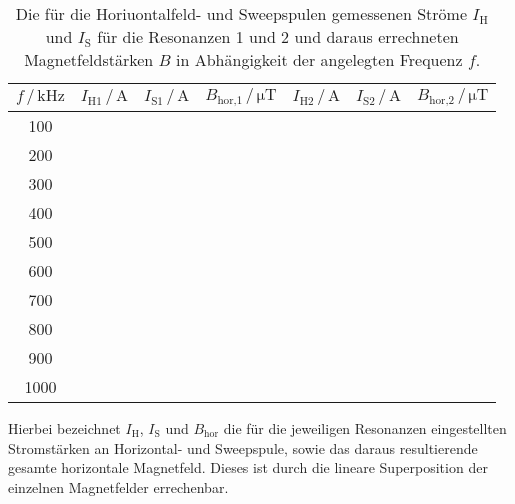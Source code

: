 \begin{table}
  \centering
  \caption{Die für die Horiuontalfeld- und Sweepspulen gemessenen Ströme $I_\text{H}$ und $I_\text{S}$ für die Resonanzen 1 und 2 und daraus errechneten Magnetfeldstärken $B$ in Abhängigkeit der angelegten Frequenz $f$.}
  \label{tab:mess1}
  \begin{tabular}{c c c c c c c}
  \toprule
  $f \,/\, \si{\kilo\hertz}$ & $I_\text{H1} \,/\, \si{\ampere}$ & $I_\text{S1} \,/\, \si{\ampere}$
  & $B_\text{hor,1} \,/\, \si{\micro\tesla}$ & $I_\text{H2} \,/\, \si{\ampere}$ & $I_\text{S2} \,/\, \si{\ampere}$
  & $B_\text{hor,2} \,/\, \si{\micro\tesla}$\\
  \midrule 
       100& & & & & & \\
       200& & & & & & \\
       300& & & & & & \\
       400& & & & & & \\
       500& & & & & & \\
       600& & & & & & \\
       700& & & & & & \\
       800& & & & & & \\
       900& & & & & & \\
      1000& & & & & & \\
  \bottomrule
  \end{tabular}
\end{table}

Hierbei bezeichnet $I_\text{H}$, $I_\text{S}$ und $B_\text{hor}$ die für die jeweiligen Resonanzen eingestellten Stromstärken an Horizontal- und 
Sweepspule, sowie das daraus resultierende gesamte horizontale Magnetfeld. Dieses ist durch die lineare Superposition der einzelnen Magnetfelder
errechenbar.\\

